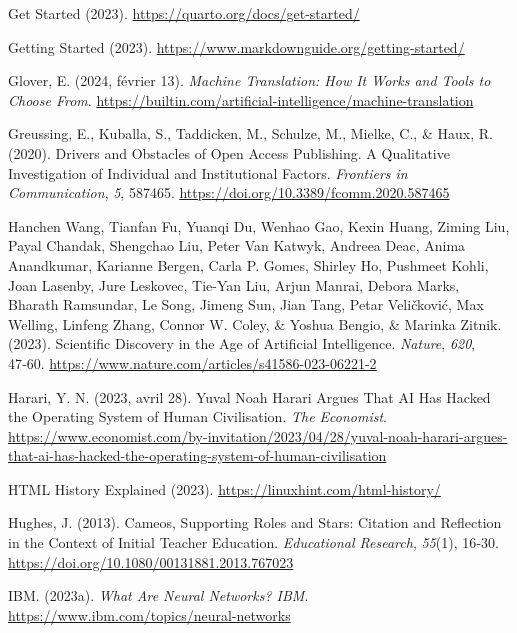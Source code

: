 \documentclass[
  letterpaper,
  DIV=11,
  numbers=noendperiod]{scrreprt}
\newlength{\cslhangindent}
\newenvironment{CSLReferences}[2] %
 {\begin{list}{}{%
  \setlength{\itemindent}{0pt}
  \setlength{\leftmargin}{0pt}
  \setlength{\parsep}{0pt}
  \ifodd #1
   \setlength{\leftmargin}{\cslhangindent}
   \setlength{\itemindent}{-1\cslhangindent}
  \fi
  \setlength{\itemsep}{#2\baselineskip}}}
 {\end{list}}
\begin{document}
\begin{CSLReferences}{1}{0}
Get {Started} (2023). \url{https://quarto.org/docs/get-started/}

Getting {Started} (2023).
\url{https://www.markdownguide.org/getting-started/}

Glover, E. (2024, février 13). \emph{Machine {Translation}: {How It
Works} and {Tools} to {Choose From}}.
\url{https://builtin.com/artificial-intelligence/machine-translation}

Greussing, E., Kuballa, S., Taddicken, M., Schulze, M., Mielke, C., \&
Haux, R. (2020). Drivers and {Obstacles} of {Open Access Publishing}. {A
Qualitative Investigation} of {Individual} and {Institutional Factors}.
\emph{Frontiers in Communication}, \emph{5}, 587465.
\url{https://doi.org/10.3389/fcomm.2020.587465}

Hanchen Wang, Tianfan Fu, Yuanqi Du, Wenhao Gao, Kexin Huang, Ziming
Liu, Payal Chandak, Shengchao Liu, Peter Van Katwyk, Andreea Deac, Anima
Anandkumar, Karianne Bergen, Carla P. Gomes, Shirley Ho, Pushmeet Kohli,
Joan Lasenby, Jure Leskovec, Tie-Yan Liu, Arjun Manrai, Debora Marks,
Bharath Ramsundar, Le Song, Jimeng Sun, Jian Tang, Petar Veličković, Max
Welling, Linfeng Zhang, Connor W. Coley, \& Yoshua Bengio, \& Marinka
Zitnik. (2023). Scientific Discovery in the Age of Artificial
Intelligence. \emph{Nature}, \emph{620}, 47‑60.
\url{https://www.nature.com/articles/s41586-023-06221-2}

Harari, Y. N. (2023, avril 28). Yuval {Noah Harari} Argues That {AI} Has
Hacked the Operating System of Human Civilisation. \emph{The Economist}.
\url{https://www.economist.com/by-invitation/2023/04/28/yuval-noah-harari-argues-that-ai-has-hacked-the-operating-system-of-human-civilisation}

{HTML History} \textbar{} {Explained} (2023).
\url{https://linuxhint.com/html-history/}

Hughes, J. (2013). Cameos, Supporting Roles and Stars: Citation and
Reflection in the Context of Initial Teacher Education.
\emph{Educational Research}, \emph{55}(1), 16‑30.
\url{https://doi.org/10.1080/00131881.2013.767023}

IBM. (2023a). \emph{What Are {Neural Networks}? \textbar{} {IBM}}.
\url{https://www.ibm.com/topics/neural-networks}


\end{CSLReferences}
\end{document}
